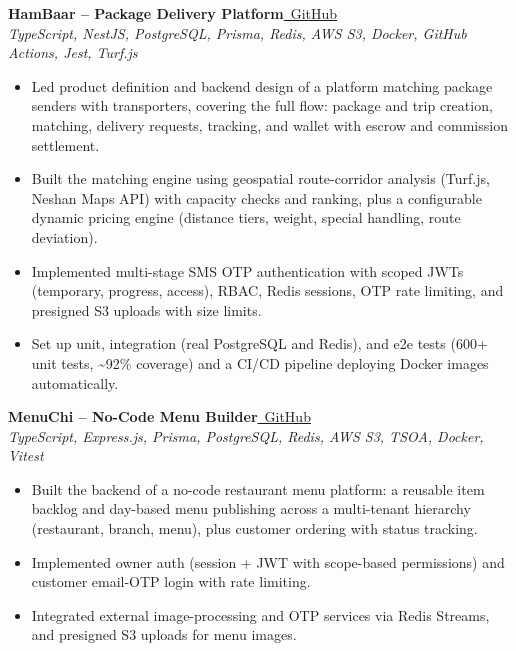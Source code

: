 \documentclass[a4paper,10pt]{article}
\newcommand{\projectheader}[3]{%
  \noindent\textbf{#1}\hfill\href{#2}{\small\faGithub\ \color{linkblue}GitHub}\\[-2pt]
  {\small\color{medgray}\textit{#3}}
  \vspace{2pt}
}
\begin{document}
\vspace{4pt}

\projectheader
  {HamBaar -- Package Delivery Platform}
  {https://github.com/1mimhe/hambaar-backend}
  {TypeScript, NestJS, PostgreSQL, Prisma, Redis, AWS S3, Docker, GitHub Actions, Jest, Turf.js}

\begin{itemize}
  \item Led product definition and backend design of a platform matching package senders with transporters, covering the full flow: package and trip creation, matching, delivery requests, tracking, and wallet with escrow and commission settlement.
  \item Built the matching engine using geospatial route-corridor analysis (Turf.js, Neshan Maps API) with capacity checks and ranking, plus a configurable dynamic pricing engine (distance tiers, weight, special handling, route deviation).
  \item Implemented multi-stage SMS OTP authentication with scoped JWTs (temporary, progress, access), RBAC, Redis sessions, OTP rate limiting, and presigned S3 uploads with size limits.
  \item Set up unit, integration (real PostgreSQL and Redis), and e2e tests (600+ unit tests, \textasciitilde 92\% coverage) and a CI/CD pipeline deploying Docker images automatically.
\end{itemize}

\vspace{4pt}

\projectheader
  {MenuChi -- No-Code Menu Builder}
  {https://github.com/1mimhe/menuchi-backend}
  {TypeScript, Express.js, Prisma, PostgreSQL, Redis, AWS S3, TSOA, Docker, Vitest}

\begin{itemize}
  \item Built the backend of a no-code restaurant menu platform: a reusable item backlog and day-based menu publishing across a multi-tenant hierarchy (restaurant, branch, menu), plus customer ordering with status tracking.
  \item Implemented owner auth (session + JWT with scope-based permissions) and customer email-OTP login with rate limiting.
  \item Integrated external image-processing and OTP services via Redis Streams, and presigned S3 uploads for menu images.
\end{itemize}

\vspace{4pt}
\end{document}

